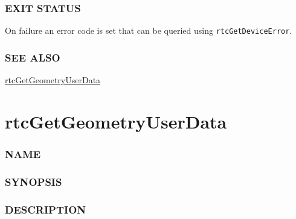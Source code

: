 \subsubsection{EXIT STATUS}\label{exit-status}

On failure an error code is set that can be queried using
\texttt{rtcGetDeviceError}.

\subsubsection{SEE ALSO}\label{see-also}

\hyperref[rtcgetgeometryuserdata]{rtcGetGeometryUserData}

\pagebreak

\section{rtcGetGeometryUserData}\label{rtcgetgeometryuserdata}

\subsubsection{NAME}\label{name}

\begin{Shaded}
\begin{Highlighting}[]
\OperatorTok{{-}}
\end{Highlighting}
\end{Shaded}

\subsubsection{SYNOPSIS}\label{synopsis}

\begin{Shaded}
\begin{Highlighting}[]

\OperatorTok{*}\OperatorTok{(}\OperatorTok{);}
\end{Highlighting}
\end{Shaded}

\subsubsection{DESCRIPTION}\label{description}

